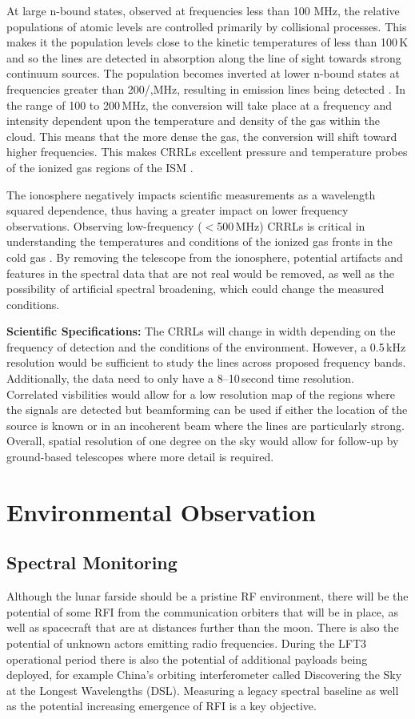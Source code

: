 At large n-bound states, observed at frequencies less than 100 MHz, the relative populations of atomic levels are controlled primarily by collisional processes. This makes it the population levels close to the kinetic temperatures of less than 100\,K and so the lines are detected in absorption along the line of sight towards strong continuum sources. The population becomes inverted at lower n-bound states at frequencies greater than 200/,MHz, resulting in emission lines being detected \citep{Tremblay_2018}. In the range of 100 to 200\,MHz, the conversion will take place at a frequency and intensity dependent upon the temperature and density of the gas within the cloud. This means that the more dense the gas, the conversion will shift toward higher frequencies. This makes CRRLs excellent pressure and temperature probes of the ionized gas regions of the ISM \citep{Salas_2019}.

The ionosphere negatively impacts scientific measurements as a wavelength squared dependence, thus having a greater impact on lower frequency observations. Observing low-frequency ($<$500\,MHz) CRRLs is critical in understanding the temperatures and conditions of the ionized gas fronts in the cold gas \citep{Salas_2018}. By removing the telescope from the ionosphere, potential artifacts and features in the spectral data that are not real would be removed, as well as the possibility of artificial spectral broadening, which could change the measured conditions.

\textbf{Scientific Specifications:} The CRRLs will change in width depending on the frequency of detection and the conditions of the environment. However, a 0.5\,kHz resolution would be sufficient to study the lines across proposed frequency bands. Additionally, the data need to only have a 8--10\,second time resolution. Correlated visbilities would allow for a low resolution map of the regions where the signals are detected but beamforming can be used if either the location of the source is known or in an incoherent beam where the lines are particularly strong. Overall, spatial resolution of one degree on the sky would allow for follow-up by ground-based telescopes where more detail is required.

\section{Environmental Observation}

\subsection{Spectral Monitoring}
Although the lunar farside should be a pristine RF environment, there will be the potential of some RFI from the communication orbiters that will be in place, as well as spacecraft that are at distances further than the moon.  There is also the potential of unknown actors emitting radio frequencies.  During the LFT3 operational period there is also the potential of additional payloads being deployed, for example China's orbiting interferometer called Discovering the Sky at the Longest Wavelengths (DSL).  Measuring a legacy spectral baseline as well as the potential increasing emergence of RFI is a key objective.


